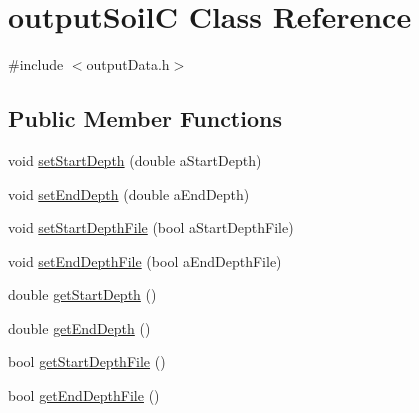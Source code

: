 \hypertarget{classoutput_soil_c}{
\section{outputSoilC Class Reference}
\label{classoutput_soil_c}
}


{\ttfamily \#include $<$outputData.h$>$}\subsection*{Public Member Functions}
\begin{DoxyCompactItemize}
\item 
void \hyperlink{classoutput_soil_c_a9c4adf898ff78966614b3feeecaf8fc5}{setStartDepth} (double aStartDepth)
\item 
void \hyperlink{classoutput_soil_c_a6e734408a56571cc454abfd26eb2771f}{setEndDepth} (double aEndDepth)
\item 
void \hyperlink{classoutput_soil_c_a7ca2e2d0b308a9189044e80baef2b8db}{setStartDepthFile} (bool aStartDepthFile)
\item 
void \hyperlink{classoutput_soil_c_a2b003cd1bde427aec963367775c62b7e}{setEndDepthFile} (bool aEndDepthFile)
\item 
double \hyperlink{classoutput_soil_c_a94147be4e9bc87c91e33f64ed23e4ce7}{getStartDepth} ()
\item 
double \hyperlink{classoutput_soil_c_a28eb8864858a89922a764f92515f9621}{getEndDepth} ()
\item 
bool \hyperlink{classoutput_soil_c_a78674bb0f37aeb3265f1462076d8ff34}{getStartDepthFile} ()
\item 
bool \hyperlink{classoutput_soil_c_a459b129365848e905ab816d90feb95b3}{getEndDepthFile} ()
\end{DoxyCompactItemize}


